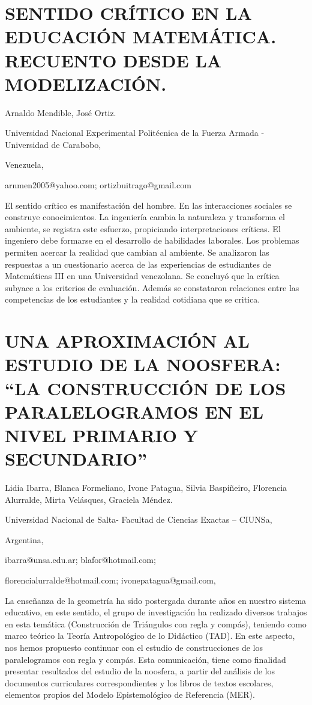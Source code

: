 \section{SENTIDO CRÍTICO EN LA EDUCACIÓN MATEMÁTICA. RECUENTO DESDE LA MODELIZACIÓN. }

\begin{datos}

Arnaldo Mendible, José Ortiz.

Universidad Nacional Experimental Politécnica de la Fuerza Armada
- Universidad de Carabobo,

Venezuela,

arnmen2005@yahoo.com; ortizbuitrago@gmail.com 

\end{datos}

El sentido crítico es manifestación del hombre. En las interacciones
sociales se construye conocimientos. La ingeniería cambia la naturaleza
y transforma el ambiente, se registra este esfuerzo, propiciando interpretaciones
críticas. El ingeniero debe formarse en el desarrollo de habilidades
laborales. Los problemas permiten acercar la realidad que cambian
al ambiente. Se analizaron las respuestas a un cuestionario acerca
de las experiencias de estudiantes de Matemáticas III en una Universidad
venezolana. Se concluyó que la crítica subyace a los criterios de
evaluación. Además se constataron relaciones entre las competencias
de los estudiantes y la realidad cotidiana que se critica. 


\section{UNA APROXIMACIÓN AL ESTUDIO DE LA NOOSFERA: “LA CONSTRUCCIÓN DE LOS
PARALELOGRAMOS EN EL NIVEL PRIMARIO Y SECUNDARIO” }

\begin{datos}

Lidia Ibarra, Blanca Formeliano, Ivone Patagua, Silvia Baspiñeiro,
Florencia Alurralde, Mirta Velásques, Graciela Méndez.

Universidad Nacional de Salta- Facultad de Ciencias Exactas – CIUNSa,

Argentina,

ibarra@unsa.edu.ar; blafor@hotmail.com;

florencialurralde@hotmail.com; ivonepatagua@gmail.com,

\end{datos}

La enseñanza de la geometría ha sido postergada durante años en nuestro
sistema educativo, en este sentido, el grupo de investigación ha realizado
diversos trabajos en esta temática (Construcción de Triángulos con
regla y compás), teniendo como marco teórico la Teoría Antropológico
de lo Didáctico (TAD). En este aspecto, nos hemos propuesto continuar
con el estudio de construcciones de los paralelogramos con regla y
compás. Esta comunicación, tiene como finalidad presentar resultados
del estudio de la noosfera, a partir del análisis de los documentos
curriculares correspondientes y los libros de textos escolares, elementos
propios del Modelo Epistemológico de Referencia (MER).


